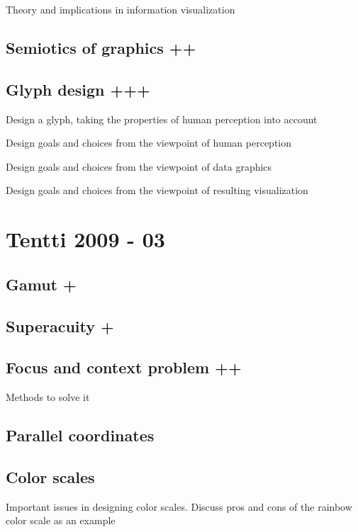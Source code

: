 \documentclass[a4paper]{article}
\begin{document}
Theory and implications in information visualization

\subsection{Semiotics of graphics ++}

\subsection{Glyph design +++}

Design a glyph, taking the properties of human perception into account

Design goals and choices from the viewpoint of human perception

Design goals and choices from the viewpoint of data graphics

Design goals and choices from the viewpoint of resulting visualization



\section{Tentti 2009 - 03}

\subsection{Gamut +}

\subsection{Superacuity +}

\subsection{Focus and context problem ++}

Methods to solve it

\subsection{Parallel coordinates}

\subsection{Color scales}

Important issues in designing color scales. Discuss pros and cons of the rainbow color scale as an example
\end{document}
